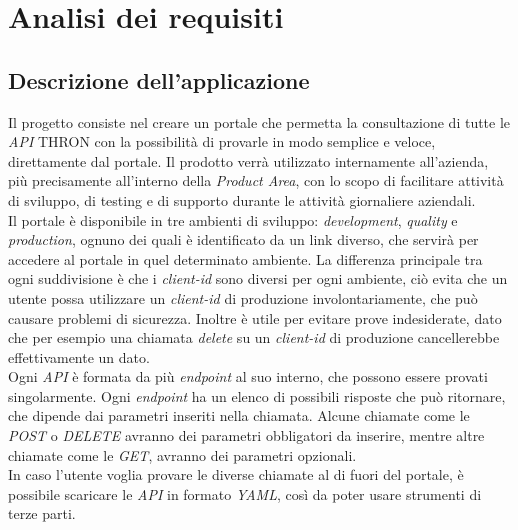 \chapter{Analisi dei requisiti}
\label{cap:analisi-requisiti}

 
\section{Descrizione dell'applicazione}

Il progetto consiste nel creare un portale che permetta la consultazione di tutte le \textit{API} THRON con la possibilità di provarle in modo semplice e veloce, direttamente dal portale.
Il prodotto verrà utilizzato internamente all'azienda, più precisamente all'interno della \textit{Product Area}, con lo scopo di facilitare attività di sviluppo, di testing e di supporto durante le attività giornaliere aziendali.\\
Il portale è disponibile in tre ambienti di sviluppo: \textit{development}, \textit{quality} e \textit{production}, ognuno dei quali è identificato da un link diverso, che servirà per accedere al portale in quel determinato ambiente.
La differenza principale tra ogni suddivisione è che i \textit{client-id} sono diversi per ogni ambiente, ciò evita che un utente possa utilizzare un \textit{client-id} di produzione involontariamente, che può causare problemi di sicurezza. Inoltre è utile per evitare prove indesiderate, dato che per esempio una chiamata \textit{delete} su un \textit{client-id} di produzione cancellerebbe effettivamente un dato.\\
Ogni \textit{API} è formata da più \textit{endpoint} al suo interno, che possono essere provati singolarmente. Ogni \textit{endpoint} ha un elenco di possibili risposte che può ritornare, che dipende dai parametri inseriti nella chiamata.
Alcune chiamate come le \textit{POST} o \textit{DELETE} avranno dei parametri obbligatori da inserire, mentre altre chiamate come le \textit{GET}, avranno dei parametri opzionali.\\
In caso l'utente voglia provare le diverse chiamate al di fuori del portale, è possibile scaricare le \textit{API} in formato \textit{YAML}, così da poter usare strumenti di terze parti.



